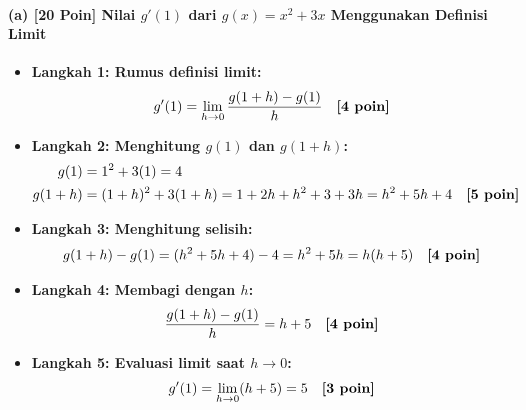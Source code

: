 \documentclass[11pt,a4paper]{article}
\begin{document}
\paragraph{(a) [20 Poin] Nilai $g'(1)$ dari $g(x) = x^2 + 3x$ Menggunakan Definisi Limit}
\begin{itemize}[leftmargin=18pt]
    \item \textbf{Langkah 1: Rumus definisi limit:}
    \[
    g'(1) = \lim_{h \to 0} \frac{g(1+h) - g(1)}{h} \quad \text{\textbf{[4 poin]}}
    \]
    \item \textbf{Langkah 2: Menghitung $g(1)$ dan $g(1+h)$:}
    \begin{align*}
        g(1) &= 1^2 + 3(1) = 4 \\
        g(1+h) &= (1+h)^2 + 3(1+h) = 1 + 2h + h^2 + 3 + 3h = h^2 + 5h + 4 \quad \text{\textbf{[5 poin]}}
    \end{align*}
    \item \textbf{Langkah 3: Menghitung selisih:}
    \[
    g(1+h) - g(1) = (h^2 + 5h + 4) - 4 = h^2 + 5h = h(h + 5) \quad \text{\textbf{[4 poin]}}
    \]
    \item \textbf{Langkah 4: Membagi dengan $h$:}
    \[
    \frac{g(1+h) - g(1)}{h} = h + 5 \quad \text{\textbf{[4 poin]}}
    \]
    \item \textbf{Langkah 5: Evaluasi limit saat $h \to 0$:}
    \[
    g'(1) = \lim_{h \to 0}(h + 5) = 5 \quad \text{\textbf{[3 poin]}}
    \]
\end{itemize}
\end{document}
